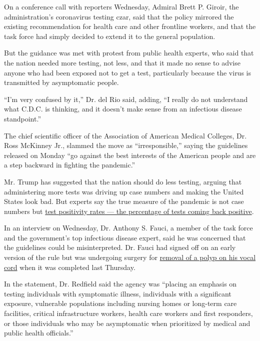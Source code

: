 On a conference call with reporters Wednesday, Admiral Brett P. Giroir,
the administration's coronavirus testing czar, said that the policy
mirrored the existing recommendation for health care and other frontline
workers, and that the task force had simply decided to extend it to the
general population.

But the guidance was met with protest from public health experts, who
said that the nation needed more testing, not less, and that it made no
sense to advise anyone who had been exposed not to get a test,
particularly because the virus is transmitted by asymptomatic people.

``I'm very confused by it,'' Dr. del Rio said, adding, ``I really do not
understand what C.D.C. is thinking, and it doesn't make sense from an
infectious disease standpoint.''

The chief scientific officer of the Association of American Medical
Colleges, Dr. Ross McKinney Jr., slammed the move as ``irresponsible,''
saying the guidelines released on Monday ``go against the best interests
of the American people and are a step backward in fighting the
pandemic.''

Mr. Trump has suggested that the nation should do less testing, arguing
that administering more tests was driving up case numbers and making the
United States look bad. But experts say the true measure of the pandemic
is not case numbers but
\href{https://www.nytimes3xbfgragh.onion/interactive/2020/us/coronavirus-testing.html}{test
positivity rates --- the percentage of tests coming back positive}.

In an interview on Wednesday, Dr. Anthony S. Fauci, a member of the task
force and the government's top infectious disease expert, said he was
concerned that the guidelines could be misinterpreted. Dr. Fauci had
signed off on an early version of the rule but was undergoing surgery
for
\href{https://www.nytimes3xbfgragh.onion/interactive/2020/08/27/upshot/fauci-media-appearances.html}{removal
of a polyp on his vocal cord} when it was completed last Thursday.

In the statement, Dr. Redfield said the agency was ``placing an emphasis
on testing individuals with symptomatic illness, individuals with a
significant exposure, vulnerable populations including nursing homes or
long-term care facilities, critical infrastructure workers, health care
workers and first responders, or those individuals who may be
asymptomatic when prioritized by medical and public health officials.''

